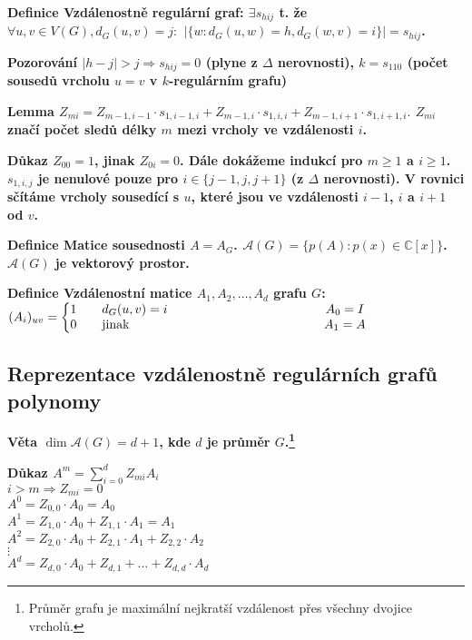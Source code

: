 \documentclass[a4paper,12pt,titlepage]{article}
\newcommand{\lm}{\smallskip\noindent\bf Lemma\rm{} }
\newcommand{\dk}{\smallskip\noindent\bf Důkaz\rm{} }
\newcommand{\df}{\smallskip\noindent\bf Definice\rm{} }
\newcommand{\vt}{\smallskip\noindent\bf Věta\rm{} }
\newcommand{\poz}{\smallskip\noindent\bf Pozorování\rm{} }
\newcommand{\A}{\mathcal{A}}
\newcommand{\C}{\mathbb{C}}
\begin{document}
\df Vzdálenostně regulární graf: $\exists s_{hij}$ t. že $\forall u,v\in V(G), d_G(u,v) = j:$ $|\{w: d_G(u,w) = h, d_G(w,v) = i\}| = s_{hij}$.

\poz $|h-j| > j \Rightarrow s_{hij} = 0$ (plyne z $\Delta$ nerovnosti), $k = s_{110}$ (počet sousedů vrcholu $u = v$ v $k$-regulárním grafu)

\lm $Z_{mi} = Z_{m-1,i-1} \cdot s_{1,i-1,i} + Z_{m-1,i} \cdot s_{1,i,i} + Z_{m-1,i+1} \cdot s_{1,i+1,i}.$ $Z_{mi}$ značí počet sledů délky $m$ mezi vrcholy ve vzdálenosti $i$.

\dk $Z_{00} = 1$, jinak $Z_{0i} = 0$. Dále dokážeme indukcí pro $m \ge 1$ a $i
\ge 1$. $s_{1,i,j}$ je nenulové pouze pro $i \in \{j-1,j,j+1\}$ (z $\Delta$
nerovnosti). V rovnici sčítáme vrcholy sousedící s $u$, které jsou ve
vzdálenosti $i-1$, $i$ a $i+1$ od $v$.

\df Matice sousednosti $A = A_G$. $\A(G) = \{p(A): p(x) \in \C[x]\}$. $\A(G)$ je
vektorový prostor.

\df Vzdálenostní matice $A_1, A_2, \dots, A_d$ grafu $G$: \\
\indent $(A_i)_{uv} = \left\{\begin{matrix}
1\quad & d_G(u,v) = i \hfill & \hspace{4cm} A_0 = I \\
0\quad & \text{jinak} \hfill & \hspace{4cm} A_1 = A \\
\end{matrix}\right.$

\subsection{Reprezentace vzdálenostně regulárních grafů polynomy}

\vt $\dim \A(G) = d+1$, kde $d$ je průměr $G$.\footnote{Průměr grafu je maximální nejkratší vzdálenost přes všechny dvojice vrcholů.}

\dk $A^m = \sum_{i=0}^d Z_{mi}A_i$ \\
$i > m \Rightarrow Z_{mi} = 0$ \\
$A^0 = Z_{0,0} \cdot A_0 = A_0$\\
$A^1 = Z_{1,0} \cdot A_0 + Z_{1,1} \cdot A_1 = A_1$\\
$A^2 = Z_{2,0} \cdot A_0 + Z_{2,1} \cdot A_1 + Z_{2,2} \cdot A_2$\\
$\vdots$\\
$A^d = Z_{d,0} \cdot A_0 + Z_{d,1} + \dots + Z_{d,d}\cdot A_d$
\end{document}
